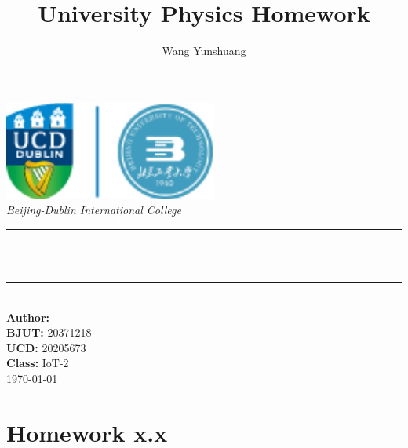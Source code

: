 \documentclass[12pt]{article}
\title{University Physics Homework}
\author{Wang Yunshuang} %
\begin{document}
    
\begin{titlepage} %
    \newcommand{\HRule}{\rule{\linewidth}{0.5mm}}
    \begin{center}
        \includegraphics[width=7cm]{ucdBDIC_logo.png}
        \quad\\[1.5cm]
        \textsl{\Large Beijing-Dublin International College }\\[0.5cm] 
        \makeatletter
        \HRule \\[0.4cm]
	    { \huge \bfseries \@title}\\[0.5cm] 
	    \HRule \\[1.5cm]
		{\large \textbf{Author:} \@author}\\[0.8cm] 
		{\large \textbf{BJUT:} 20371218}\\[0.8cm] %
		{\large \textbf{UCD:} 20205673}\\[0.8cm] %
        {\large \textbf{Class:} IoT-2 } \\[5cm] %
	    {\large \today}\\[2cm] 
    \end{center}
\end{titlepage}

\section{Homework x.x}
\subsection{}
\subsection{}
\end{document}
